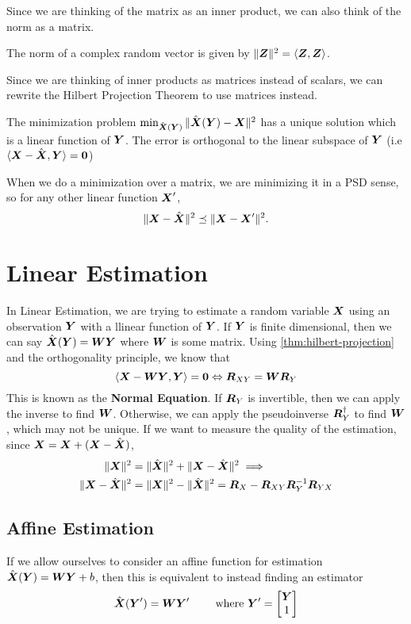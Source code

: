 Since we are thinking of the matrix as an inner product, we can also think of the norm as a matrix.
\begin{definition}
	The norm of a complex random vector is given by $\|\boldsymbol{Z}\|^2 = \langle \boldsymbol{Z}, \boldsymbol{Z} \rangle$.
	\label{defn:norm}
\end{definition}
Since we are thinking of inner products as matrices instead of scalars, we can rewrite the Hilbert Projection Theorem to use matrices instead.
\begin{theorem}
	The minimization problem $\min_{\hat{\boldsymbol{X}}(\boldsymbol{Y})}\|\hat{\boldsymbol{X}}(\boldsymbol{Y}) - \boldsymbol{X}\|^2$ has a unique solution which is a linear function of $\boldsymbol{Y}$. The error is orthogonal to the linear subspace of $\boldsymbol{Y}$ (i.e $\langle \boldsymbol{X} - \hat{\boldsymbol{X}}, \boldsymbol{Y} \rangle = \boldsymbol{0}$)
	\label{thm:hilbert-projection}
\end{theorem}
When we do a minimization over a matrix, we are minimizing it in a PSD sense, so for any other linear function $\boldsymbol{X}'$, \[
	\|\boldsymbol{X}-\hat{\boldsymbol{X}}\|^2  \preceq \|\boldsymbol{X} - \boldsymbol{X}'\|^2.
\]
\section{Linear Estimation}
In Linear Estimation, we are trying to estimate a random variable $\boldsymbol{X}$ using an observation $\boldsymbol{Y}$ with a llinear function of $\boldsymbol{Y}$.
If $\boldsymbol{Y}$ is finite dimensional, then we can say $\hat{\boldsymbol{X}}(\boldsymbol{Y}) = \boldsymbol{W}\boldsymbol{Y}$ where $\boldsymbol{W}$ is some matrix.
Using \cref{thm:hilbert-projection} and the orthogonality principle, we know that
\[
	\langle \boldsymbol{X}-\boldsymbol{W}\boldsymbol{Y}, \boldsymbol{Y} \rangle = \boldsymbol{0} \Leftrightarrow \boldsymbol{R}_{XY} = \boldsymbol{W}\boldsymbol{R}_Y
\]
This is known as the \textbf{Normal Equation}.
If $\boldsymbol{R}_Y$ is invertible, then we can apply the inverse to find $\boldsymbol{W}$.
Otherwise, we can apply the pseudoinverse $\boldsymbol{R}_Y^\dagger$ to find $\boldsymbol{W}$, which may not be unique.
If we want to measure the quality of the estimation, since $\boldsymbol{X} = \boldsymbol{X}+(\boldsymbol{X}-\hat{\boldsymbol{X}})$,
\begin{align*}
	\|\boldsymbol{X}\|^2 &= \|\hat{\boldsymbol{X}}\|^2 + \|\boldsymbol{X} - \hat{\boldsymbol{X}}\|^2 \implies \\
	\|\boldsymbol{X}-\hat{\boldsymbol{X}}\|^2 &= \|\boldsymbol{X}\|^2 - \|\hat{\boldsymbol{X}}\|^2 = \boldsymbol{R}_X - \boldsymbol{R}_{XY}\boldsymbol{R}_Y^{-1}\boldsymbol{R}_{YX}
\end{align*}
\subsection{Affine Estimation}
If we allow ourselves to consider an affine function for estimation $\hat{\boldsymbol{X}}(\boldsymbol{Y}) = \boldsymbol{W}\boldsymbol{Y}+b$, then this is equivalent to instead finding an estimator
\[
	\hat{\boldsymbol{X}}(\boldsymbol{Y}') = \boldsymbol{W}\boldsymbol{Y}' \qquad \text{ where } \boldsymbol{Y}' = \begin{bmatrix} \boldsymbol{Y} \\ 1 \end{bmatrix}
\]

